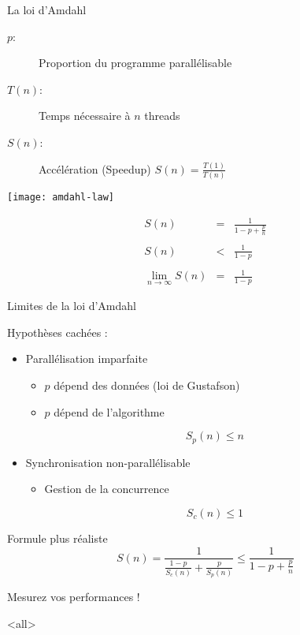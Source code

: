 \begin{frame}{La loi d'Amdahl}
    \begin{description}
    \item[$p$: ] Proportion du programme parallélisable 
    \item[$T(n)$: ] Temps nécessaire à $n$ threads
    \item[$S(n)$: ] Accélération (Speedup) $S(n) = \frac{T(1)}{T(n)}$ 
    \end{description}
    \pause
    \hspace{\fill}
    \begin{minipage}{.6\textwidth}
    \texttt{[image: amdahl-law]}
    \end{minipage}
    \hspace{\fill}
    \begin{minipage}{.35\textwidth}
      \vspace{-1cm}
      $$
      \begin{array}{rcl}
        \displaystyle S(n) &\displaystyle =& \displaystyle \frac{1}{1-p + \frac{p}{n}}\\
        \\
        \displaystyle S(n) &\displaystyle <& \displaystyle\frac{1}{1-p}\\
        \\
        \displaystyle \lim_{n\rightarrow \infty} S(n) &\displaystyle =& \displaystyle \frac{1}{1-p}
      \end{array}
      $$
    \end{minipage}
    \hspace{\fill}
\end{frame}
 
\begin{frame}{Limites de la loi d'Amdahl}
  \begin{block}{Hypothèses cachées :}
    \begin{itemize}
    \item Parallélisation imparfaite
    \begin{itemize}
    \item $p$ dépend des données (loi de Gustafson)
    \item $p$ dépend de l'algorithme
    \end{itemize}
    $$S_p(n) \le n$$
  \item Synchronisation non-parallélisable
    \begin{itemize}
    \item Gestion de la concurrence
    \end{itemize}
    $$S_c(n) \le 1$$
    \end{itemize}
  \end{block}
  \begin{block}{Formule plus réaliste}
    $$
    S(n) = \frac{1}{\frac{1-p}{S_c(n)} + \frac{p}{S_p(n)}} \le \frac{1}{1-p + \frac{p}{n}}
    $$
    \begin{center}
      \alert{Mesurez vos performances !}
    \end{center}
  \end{block}
\end{frame}



\mode<all>


